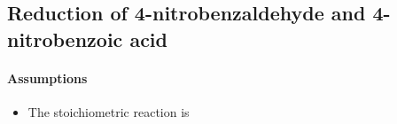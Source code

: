 

\subsection{Reduction of 4-nitrobenzaldehyde and 4-nitrobenzoic acid}
\paragraph{Assumptions}
\begin{itemize}
    \item The stoichiometric reaction is 
\end{itemize}
